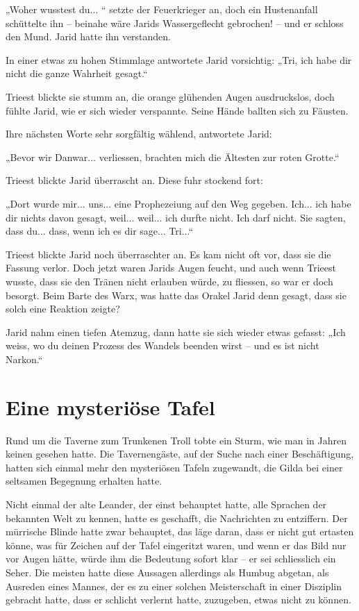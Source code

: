 „Woher wusstest du... “ setzte der Feuerkrieger an, doch ein Hustenanfall schüttelte ihn – beinahe wäre Jarids Wassergeflecht gebrochen! – und er schloss den Mund. Jarid hatte ihn verstanden.

In einer etwas zu hohen Stimmlage antwortete Jarid vorsichtig: „Tri, ich habe dir nicht die ganze Wahrheit gesagt.“

Trieest blickte sie stumm an, die orange glühenden Augen ausdruckslos, doch fühlte Jarid, wie er sich wieder verspannte. Seine Hände ballten sich zu Fäusten.

Ihre nächsten Worte sehr sorgfältig wählend, antwortete Jarid:

„Bevor wir Danwar... verliessen, brachten mich die Ältesten zur roten Grotte.“

Trieest blickte Jarid überrascht an. Diese fuhr stockend fort:

„Dort wurde mir... uns... eine Prophezeiung auf den Weg gegeben. Ich... ich habe dir nichts davon gesagt, weil... weil... ich durfte nicht. Ich darf nicht. Sie sagten, dass du... dass, wenn ich es dir sage... Tri...“

Trieest blickte Jarid noch überraschter an. Es kam nicht oft vor, dass sie die Fassung verlor. Doch jetzt waren Jarids Augen feucht, und auch wenn Trieest wusste, dass sie den Tränen nicht erlauben würde, zu fliessen, so war er doch besorgt. Beim Barte des Warx, was hatte das Orakel Jarid denn gesagt, dass sie solch eine Reaktion zeigte?

Jarid nahm einen tiefen Atemzug, dann hatte sie sich wieder etwas gefasst: „Ich weiss, wo du deinen Prozess des Wandels beenden wirst – und es ist nicht Narkon.“





\newpage
\section{Eine mysteriöse Tafel}

Rund um die Taverne zum Trunkenen Troll tobte ein Sturm, wie man in Jahren keinen gesehen hatte. Die Tavernengäste, auf der Suche nach einer Beschäftigung, hatten sich einmal mehr den mysteriösen Tafeln zugewandt, die Gilda bei einer seltsamen Begegnung erhalten hatte.

Nicht einmal der alte Leander, der einst behauptet hatte, alle Sprachen der bekannten Welt zu kennen, hatte es geschafft, die Nachrichten zu entziffern. Der mürrische Blinde hatte zwar behauptet, das läge daran, dass er nicht gut ertasten könne, was für Zeichen auf der Tafel eingeritzt waren, und wenn er das Bild nur vor Augen hätte, würde ihm die Bedeutung sofort klar – er sei schliesslich ein Seher. Die meisten hatte diese Aussagen allerdings als Humbug abgetan, als Ausreden eines Mannes, der es zu einer solchen Meisterschaft in einer Disziplin gebracht hatte, dass er schlicht verlernt hatte, zuzugeben, etwas nicht zu können.

